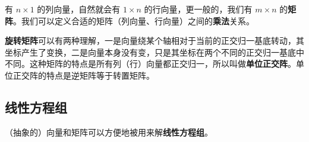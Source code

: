 
有 $n \times 1$ 的列向量，自然就会有 $1 \times n$ 的行向量，更一般的，我们有 $m \times n$ 的\textbf{矩阵}。我们可以定义合适的矩阵（列向量、行向量）之间的\textbf{乘法}关系。







\textbf{旋转矩阵}可以有两种理解，一是向量绕某个轴相对于当前的正交归一基底转动，其坐标产生了变换，二是向量本身没有变，只是其坐标在两个不同的正交归一基底中不同。这种矩阵的特点是所有列（行）向量都正交归一，所以叫做\textbf{单位正交阵}。单位正交阵的特点是逆矩阵等于转置矩阵。






\subsection{线性方程组}

（抽象的）向量和矩阵可以方便地被用来解\textbf{线性方程组}。
